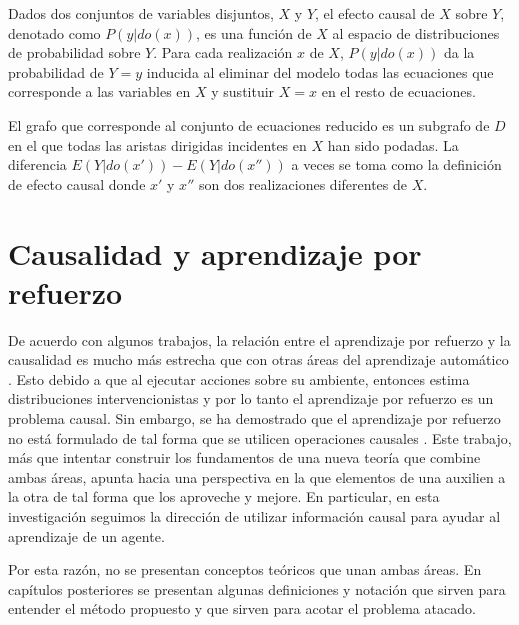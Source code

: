 Dados dos conjuntos de variables disjuntos, $X$ y $Y$,
el efecto causal de $X$ sobre $Y$, denotado como $P(y|do(x))$, es una
función de $X$ al espacio de distribuciones de probabilidad sobre $Y$. Para 
cada realización $x$ de $X$, $P(y| do(x))$ da la probabilidad de $Y=y$ 
inducida al eliminar del modelo todas las ecuaciones que corresponde a las
variables en $X$ y sustituir $X=x$ en el resto de ecuaciones.

El grafo que corresponde al conjunto de ecuaciones reducido es un
subgrafo de $D$ en el que todas las aristas dirigidas incidentes en $X$
han sido podadas. La diferencia $E(Y|do(x'))- E(Y|do(x''))$ a veces 
se toma como la definición de efecto causal \cite{theoryofcausalities2006}
donde $x'$ y $x''$ son dos realizaciones diferentes de $X$.






\section{Causalidad y aprendizaje por refuerzo}

De acuerdo con algunos trabajos, la relación entre el aprendizaje por refuerzo
y la causalidad es mucho más estrecha que con otras áreas del
aprendizaje automático \cite{schlkopf2019causality} \cite{Gershman2017}. Esto debido a que al ejecutar acciones sobre su ambiente, entonces
estima distribuciones intervencionistas y por lo tanto el aprendizaje por refuerzo es un problema causal. Sin embargo, se ha demostrado que el aprendizaje
por refuerzo no está formulado de tal forma que se utilicen operaciones
causales \cite{gonzalezsoto2019reinforcement}.
Este trabajo, más que intentar construir los fundamentos de una nueva 
teoría que combine ambas áreas, apunta hacia una perspectiva
en la que elementos de una auxilien a la otra de tal forma que
los aproveche y mejore. En particular, en esta investigación
seguimos la dirección de utilizar información causal para ayudar al 
aprendizaje de un agente.

Por esta razón, no se presentan conceptos teóricos que unan ambas áreas. 
En capítulos posteriores se presentan algunas definiciones y notación
que sirven para entender el método propuesto y que sirven para acotar el
problema atacado.
